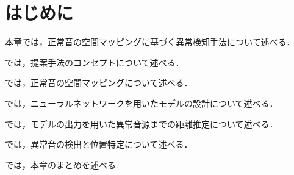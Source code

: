 \documentclass[../main]{subfiles}
\begin{document}
\section{はじめに}
\label{sec:pmethod_introduction}

本章では，正常音の空間マッピングに基づく異常検知手法について述べる．

では，提案手法のコンセプトについて述べる．

では，正常音の空間マッピングについて述べる．

では，ニューラルネットワークを用いたモデルの設計について述べる．

では，モデルの出力を用いた異常音源までの距離推定について述べる．

では，異常音の検出と位置特定について述べる．

では，本章のまとめを述べる.
\end{document}
